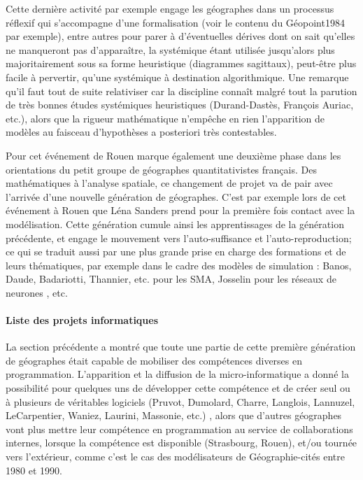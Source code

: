 Cette dernière activité par exemple engage les géographes dans un processus réflexif qui s'accompagne d'une formalisation (voir le contenu du Géopoint1984 par exemple), entre autres pour parer à d'éventuelles dérives dont on sait qu'elles ne manqueront pas d'apparaître, la systémique étant utilisée jusqu'alors plus majoritairement sous sa forme heuristique (diagrammes sagittaux), peut-être plus facile à pervertir, qu'une systémique à destination algorithmique. Une remarque qu'il faut tout de suite relativiser car la discipline connaît malgré tout la parution de très bonnes études systémiques heuristiques (Durand-Dastès, François Auriac, etc.), alors que la rigueur mathématique n'empêche en rien l'apparition de modèles au faisceau d'hypothèses a posteriori très contestables. \textcite{Orain2001} %

Pour \autocite[320-321]{Cuyala2014} cet événement de Rouen marque également une deuxième phase dans les orientations du petit groupe de géographes quantitativistes français. Des mathématiques à l'analyse spatiale, ce changement de projet va de pair avec l'arrivée d'une nouvelle génération de géographes. C'est par exemple lors de cet événement à Rouen que Léna Sanders prend pour la première fois contact avec la modélisation. Cette génération cumule ainsi les apprentissages de la génération précédente, et engage le mouvement vers l'auto-suffisance et l'auto-reproduction; ce qui se traduit aussi par une plus grande prise en charge des formations et de leurs thématiques, par exemple dans le cadre des modèles de simulation : Banos, Daude, Badariotti, Thannier, etc. pour les SMA, Josselin pour les réseaux de neurones \autocite{Dumolard1994}, etc.

\paragraph{Liste des projets informatiques}

La section précédente a montré que toute une partie de cette première génération de géographes était capable de mobiliser des compétences diverses en programmation. L'apparition et la diffusion de la micro-informatique a donné la possibilité pour quelques uns de développer cette compétence et de créer seul ou à plusieurs de véritables logiciels (Pruvot, Dumolard, Charre, Langlois, Lannuzel, LeCarpentier, Waniez, Laurini, Massonie, etc.) \autocites[191]{Mathieu2014, Massonie1986, Charre1989}, alors que d'autres géographes vont plus mettre leur compétence en programmation au service de collaborations internes, lorsque la compétence est disponible (Strasbourg, Rouen), et/ou tournée vers l'extérieur, comme c'est le cas des modélisateurs de Géographie-cités entre 1980 et 1990.

